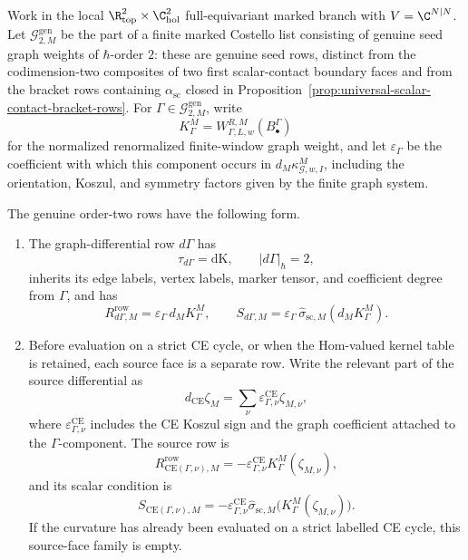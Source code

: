 \begin{prop}\label{prop:genuine-order-two-graph-weight-rows}
  Work in the local
  \(\R^2_{\mathrm{top}}\times\C^2_{\mathrm{hol}}\) full-equivariant marked
  branch with \(V=\C^{N|N}\).  Let
  \(\mathcal G^{\mathrm{gen}}_{2,M}\) be the part of a finite marked
  Costello list consisting of genuine seed graph weights of
  \(\hbar\)-order \(2\): these are genuine seed rows, distinct from the
  codimension-two composites of two first scalar-contact boundary faces
  and from the bracket rows containing \(\alpha_{\mathrm{sc}}\) closed in
  Proposition~\ref{prop:universal-scalar-contact-bracket-rows}.  For
  \(\Gamma\in\mathcal G^{\mathrm{gen}}_{2,M}\), write
  \[
    K^M_\Gamma=
    W^{R,M}_{\Gamma,L,w}(B^\Gamma_\bullet)
  \]
  for the normalized renormalized finite-window graph weight, and let
  \(\varepsilon_\Gamma\) be the coefficient with which this component
  occurs in \(d_M\kappa^M_{\mathcal G,w,I}\), including the orientation,
  Koszul, and symmetry factors given by the finite graph system.

  The genuine order-two rows have the following form.
  \begin{enumerate}[label=(G\arabic*)]
    \item The graph-differential row \(d\Gamma\) has
      \[
        \tau_{d\Gamma}=\mathrm{dK},\qquad |d\Gamma|_\hbar=2,
      \]
      inherits its edge labels, vertex labels, marker tensor, and
      coefficient degree from \(\Gamma\), and has
      \[
        R^{\mathrm{row}}_{d\Gamma,M}
          =
        \varepsilon_\Gamma\,d_M K^M_\Gamma,
        \qquad
        S_{d\Gamma,M}
          =
        \varepsilon_\Gamma\,
        \widehat\sigma_{\mathrm{sc},M}(d_M K^M_\Gamma).
      \]

    \item Before evaluation on a strict CE cycle, or when the Hom-valued
      kernel table is retained, each source face is a separate row.  Write
      the relevant part of the source differential as
      \[
        d_{\mathrm{CE}}\zeta_M
          =
        \sum_\nu
        \varepsilon^{\mathrm{CE}}_{\Gamma,\nu}\zeta_{M,\nu},
      \]
      where \(\varepsilon^{\mathrm{CE}}_{\Gamma,\nu}\) includes the CE
      Koszul sign and the graph coefficient attached to the
      \(\Gamma\)-component.  The source row is
      \[
        R^{\mathrm{row}}_{\mathrm{CE}(\Gamma,\nu),M}
          =
        -\varepsilon^{\mathrm{CE}}_{\Gamma,\nu}
        K^M_\Gamma(\zeta_{M,\nu}),
      \]
      and its scalar condition is
      \[
        S_{\mathrm{CE}(\Gamma,\nu),M}
          =
        -\varepsilon^{\mathrm{CE}}_{\Gamma,\nu}
        \widehat\sigma_{\mathrm{sc},M}
        \bigl(K^M_\Gamma(\zeta_{M,\nu})\bigr).
      \]
      If the curvature has already been evaluated on a strict labelled CE
      cycle, this source-face family is empty.
  \end{enumerate}


\end{prop}

